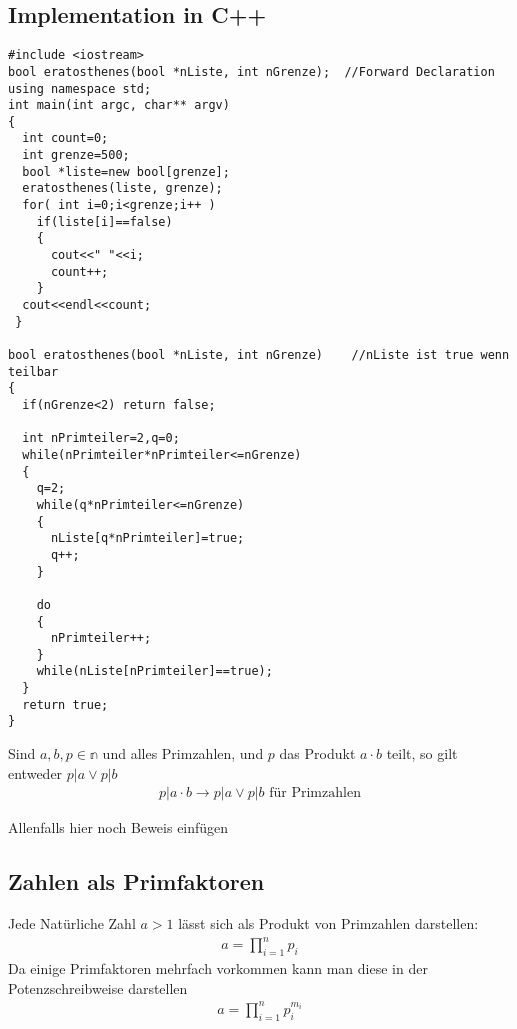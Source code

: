 \documentclass[a4paper]{scrartcl}
\begin{document}
\subsection{Implementation in C++}
\begin{verbatim}
#include <iostream>
bool eratosthenes(bool *nListe, int nGrenze);  //Forward Declaration
using namespace std;
int main(int argc, char** argv)
{
  int count=0;
  int grenze=500;
  bool *liste=new bool[grenze];
  eratosthenes(liste, grenze);
  for( int i=0;i<grenze;i++ )
    if(liste[i]==false)
    {
      cout<<" "<<i;
      count++;
    }
  cout<<endl<<count;
 }

bool eratosthenes(bool *nListe, int nGrenze)    //nListe ist true wenn teilbar
{
  if(nGrenze<2) return false;

  int nPrimteiler=2,q=0;
  while(nPrimteiler*nPrimteiler<=nGrenze)
  {
    q=2;
    while(q*nPrimteiler<=nGrenze)
    {
      nListe[q*nPrimteiler]=true;
      q++;
    }

    do
    {
      nPrimteiler++;
    }
    while(nListe[nPrimteiler]==true);
  }
  return true;
}
\end{verbatim}

Sind $a, b, p \in \mathbb{n}$ und alles Primzahlen, und $p$ das Produkt $a \cdot b$ teilt, so gilt entweder $p | a \vee p | b$
\begin{align}
p | a \cdot b \rightarrow p |a \vee p| b  \text{ für Primzahlen}
\end{align} 

Allenfalls hier noch Beweis einfügen

\subsection{Zahlen als Primfaktoren}
Jede Natürliche Zahl $a>1$ lässt sich als Produkt von Primzahlen darstellen: \\
\begin{align}
a =\prod\limits_{i=1}^n p_i
\end{align}
Da einige Primfaktoren mehrfach vorkommen kann man diese in der Potenzschreibweise darstellen \\
\begin{align}
a =\prod\limits_{i=1}^n p_i^{m_i}
\end{align}
\end{document}
